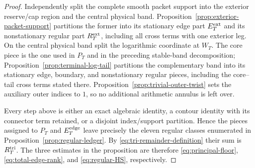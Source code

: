 \begin{proof}
Independently split the complete smooth packet support into the exterior
reserve/cap region and the central physical band.  Proposition~\ref{prop:exterior-packet-support}
partitions the former into its stationary edge part $E_T^{\rm ext}$ and its
nonstationary regular part $R_T^{\rm ext}$, including all cross terms with one
exterior leg.  On the central physical band split the logarithmic coordinate at
$W_T$. The core piece is the one used in $P_T$ and in the preceding stable-band
decomposition; Proposition~\ref{prop:terminal-log-tail} partitions the
complementary band into its stationary edge, boundary, and nonstationary
regular pieces, including the core--tail cross terms stated there.
Proposition~\ref{prop:trivial-outer-twist} sets the auxiliary outer indices to
$1$, so no additional arithmetic annulus is left over.

Every step above is either an exact algebraic identity, a contour identity with
its connector term retained, or a disjoint index/support partition.  Hence the
pieces assigned to $P_T$ and $E_T^{\rm edge}$ leave precisely the eleven
regular classes enumerated in Proposition~\ref{prop:regular-ledger}.  By
\eqref{eq:tri-remainder-definition} their sum is $R_T^{\rm tri}$.  The three
estimates in the proposition are therefore
\eqref{eq:principal-floor}, \eqref{eq:total-edge-rank}, and
\eqref{eq:regular-HS}, respectively.
\end{proof}
